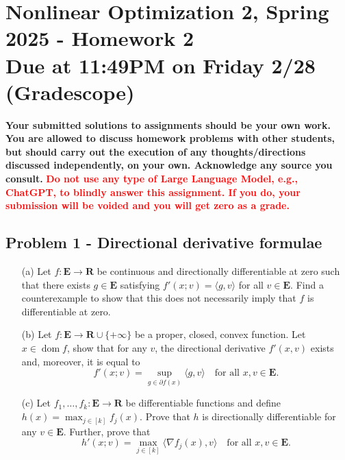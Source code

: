 \documentclass[11pt]{article}
\date{}
\title{}
\newcommand{\RR}{\mathbf{R}}
\newcommand{\EEE}{\mathbf{E}}
\newcommand{\dom}{\operatorname{dom}}
\begin{document}
\section*{\textbf{Nonlinear Optimization 2, Spring 2025 - Homework 2} \\ Due at 11:49PM on Friday 2/28 (Gradescope)}
\label{sec:org414c513}
\textbf{Your submitted solutions to assignments should be your own work. You are allowed to discuss homework problems with other students, but should carry out the execution of any thoughts/directions discussed independently, on your own. Acknowledge any source you consult.}
\textbf{\textcolor{red}{Do not use any type of Large Language Model, e.g., ChatGPT, to blindly answer this assignment. If you do, your submission will be voided and you will get zero as a grade.}} \vspace{.5cm}
\subsection*{Problem 1 - Directional derivative formulae}
\label{sec:org7243844}
\begin{itemize}
\item[(a)] Let $f \colon \EEE \rightarrow \RR$ be continuous and directionally differentiable at zero such that there exists $g\in \EEE$ satisfying  $f'(x; v) = \langle g, v \rangle$ for all $v \in \EEE$. Find a counterexample to show that this does not necessarily imply that $f$ is differentiable at zero.
\item[(b)] Let $f \colon \EEE \rightarrow \RR \cup \{+ \infty\}$ be a proper, closed, convex function. Let $x \in \dom f$, show that for any $v$, the directional derivative $f'(x, v)$ exists and, moreover, it is equal to $$ f'(x; v) = \sup_{g \in \partial f(x)} \langle g, v\rangle \quad \text{for all }x, v \in \EEE.$$
\item[(c)] Let $f_{1}, \dots, f_{k} \colon \EEE \rightarrow \RR$ be differentiable functions and define $h(x) = \max_{j \in [k]} f_{j}(x)$. Prove that $h$ is directionally differentiable for any $v \in \EEE.$ Further, prove that
$$
h'(x; v) = \max_{j \in [k]} \langle \nabla f_{j}(x), v\rangle \quad \text{for all }x, v \in \EEE.
$$
\end{itemize}
\end{document}
